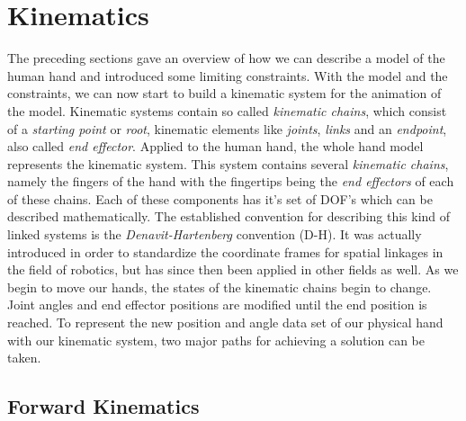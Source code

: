 \section{Kinematics}
\label{kinematics}
 The preceding sections gave an overview of how we can describe a model of the human hand and introduced some limiting constraints. With the model and the constraints, we can now start to build a kinematic system for the animation of the model.
Kinematic systems contain so called \textit{kinematic chains}, which consist of a \textit{starting point} or \textit{root}, kinematic elements like \textit{joints}, \textit{links} and an \textit{endpoint}, also called \textit{end effector}. Applied to the human hand, the whole hand model represents the kinematic system. This system contains several \textit{kinematic chains}, namely the fingers of the hand with the fingertips being the \textit{end effectors} of each of these chains.
Each of these components has it's set of DOF's which can be described mathematically. The established convention for describing this kind of linked systems is the \textit{Denavit-Hartenberg} convention (D-H)\cite{Denavit.1955}. It was actually introduced in order to standardize the coordinate frames for spatial linkages in the field of robotics, but has since then been applied in other fields as well.\cite{Spong.2008}
As we begin to move our hands, the states of the kinematic chains begin to change. Joint angles and end effector positions are modified until the end position is reached. To represent the new position and angle data set of our physical hand with our kinematic system, two major paths for achieving a solution can be taken.
 \subsection{Forward Kinematics}
 
